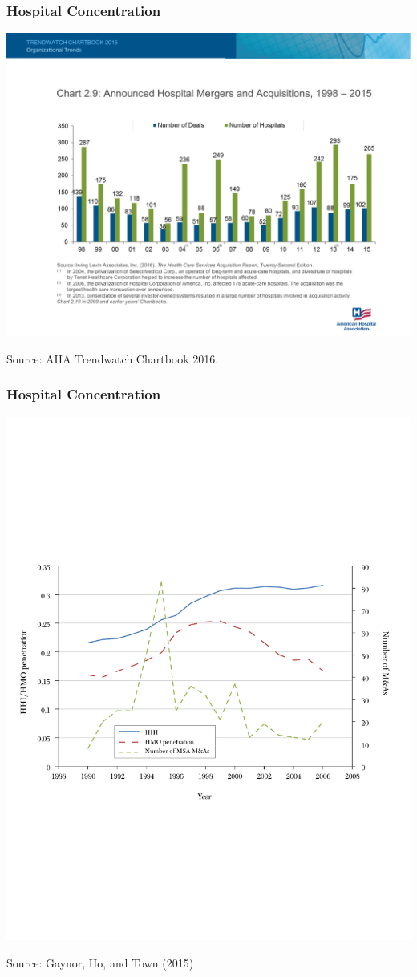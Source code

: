 \documentclass[ucs,9pt]{beamer}
\begin{document}
\begin{frame}
\frametitle{Hospital Concentration}
\begin{center}
\includegraphics[scale=0.5]{chart29}
\end{center}
\tiny Source: AHA Trendwatch Chartbook 2016.  
\end{frame}

\begin{frame}
\frametitle{Hospital Concentration}
\begin{center}
\includegraphics[scale=0.5]{gay1}
\end{center}
\tiny Source: Gaynor, Ho, and Town (2015)
\end{frame}
\end{document}

